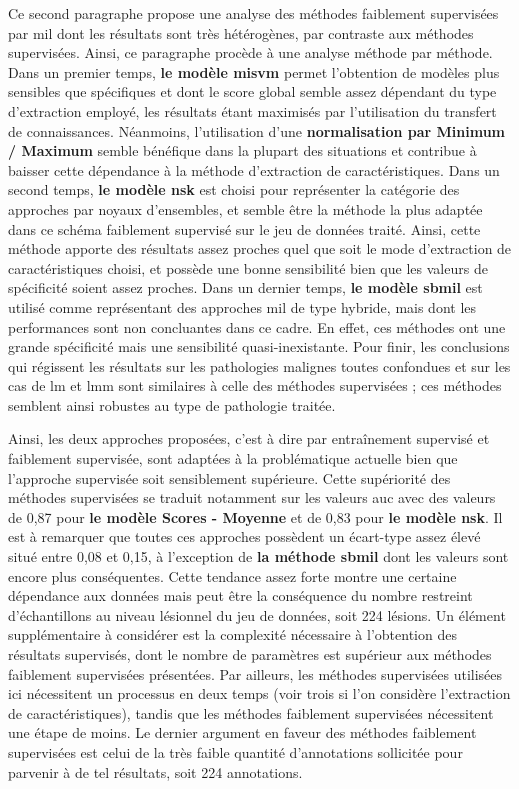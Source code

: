 Ce second paragraphe propose une analyse des méthodes faiblement supervisées par \gls{mil} dont les résultats sont très hétérogènes, par contraste aux méthodes supervisées. Ainsi, ce paragraphe procède à une analyse méthode par méthode. Dans un premier temps, \textbf{le modèle \gls{misvm}} permet l'obtention de modèles plus sensibles que spécifiques et dont le score global semble assez dépendant du type d'extraction employé, les résultats étant maximisés par l'utilisation du transfert de connaissances. Néanmoins, l'utilisation d'une \textbf{normalisation par Minimum / Maximum} semble bénéfique dans la plupart des situations et contribue à baisser cette dépendance à la méthode d'extraction de caractéristiques. Dans un second temps, \textbf{le modèle \gls{nsk}} est choisi pour représenter la catégorie des approches par noyaux d'ensembles, et semble être la méthode la plus adaptée dans ce schéma faiblement supervisé sur le jeu de données traité. Ainsi, cette méthode apporte des résultats assez proches quel que soit le mode d'extraction de caractéristiques choisi, et possède une bonne sensibilité bien que les valeurs de spécificité soient assez proches. Dans un dernier temps, \textbf{le modèle \gls{sbmil}} est utilisé comme représentant des approches \gls{mil} de type hybride, mais dont les performances sont non concluantes dans ce cadre. En effet, ces méthodes ont une grande spécificité mais une sensibilité quasi-inexistante. Pour finir, les conclusions qui régissent les résultats sur les pathologies malignes toutes confondues et sur les cas de \gls{lm} et \gls{lmm} sont similaires à celle des méthodes supervisées ; ces méthodes semblent ainsi robustes au type de pathologie traitée.\par

Ainsi, les deux approches proposées, c'est à dire par entraînement supervisé et faiblement supervisée, sont adaptées à la problématique actuelle bien que l'approche supervisée soit sensiblement supérieure. Cette supériorité des méthodes supervisées se traduit notamment sur les valeurs \gls{auc} avec des valeurs de 0,87 pour \textbf{le modèle Scores - Moyenne} et de 0,83 pour \textbf{le modèle \gls{nsk}}. Il est à remarquer que toutes ces approches possèdent un écart-type assez élevé situé entre 0,08 et 0,15, à l'exception de \textbf{la méthode \gls{sbmil}} dont les valeurs sont encore plus conséquentes. Cette tendance assez forte montre une certaine dépendance aux données mais peut être la conséquence du nombre restreint d'échantillons au niveau lésionnel du jeu de données, soit 224 lésions. Un élément supplémentaire à considérer est la complexité nécessaire à l'obtention des résultats supervisés, dont le nombre de paramètres est supérieur aux méthodes faiblement supervisées présentées. Par ailleurs, les méthodes supervisées utilisées ici nécessitent un processus en deux temps (voir trois si l'on considère l'extraction de caractéristiques), tandis que les méthodes faiblement supervisées nécessitent une étape de moins. Le dernier argument en faveur des méthodes faiblement supervisées est celui de la très faible quantité d'annotations sollicitée pour parvenir à de tel résultats, soit 224 annotations.\par

